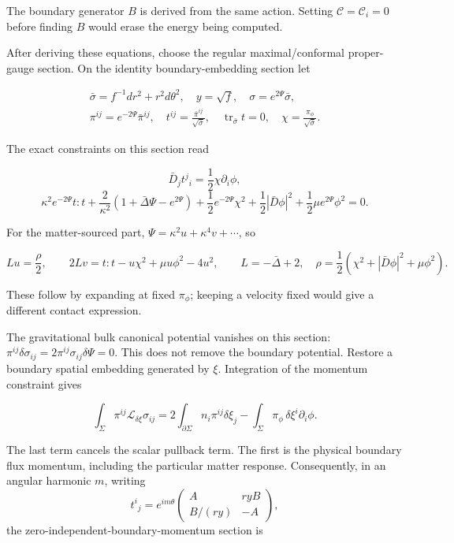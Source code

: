\documentclass[a4paper,11pt]{article}
\numberwithin{equation}{section}
\begin{document}
The boundary generator \(B\) is derived from the same action. Setting \(\mathcal C=\mathcal C_i=0\) before finding \(B\) would erase the energy being computed.

After deriving these equations, choose the regular maximal/conformal proper-gauge section. On the identity boundary-embedding section let

\[
\begin{gathered}
\bar\sigma=f^{-1}dr^2+r^2d\theta^2,\quad y=\sqrt f,\quad
\sigma=e^{2\Psi}\bar\sigma,\\
\pi^{ij}=e^{-2\Psi}\bar\pi^{ij},\quad
t^{ij}=\frac{\bar\pi^{ij}}{\sqrt{\bar\sigma}},\quad
\operatorname{tr}_{\bar\sigma}t=0,\quad
\chi=\frac{\pi_\phi}{\sqrt{\bar\sigma}}.
\end{gathered}
\tag{2.13}
\]

The exact constraints on this section read

\[
\bar D_jt^j{}_i=\frac12\chi\partial_i\phi,
\tag{2.14}
\] \[
\kappa^2e^{-2\Psi}t:t
+\frac2{\kappa^2}(1+\bar\Delta\Psi-e^{2\Psi})
+\frac12e^{-2\Psi}\chi^2
+\frac12|\bar D\phi|^2
+\frac12\mu e^{2\Psi}\phi^2=0 .
\tag{2.15}
\]

For the matter-sourced part, \(\Psi=\kappa^2u+\kappa^4v+\cdots\), so

\[
Lu=\frac{\rho}{2},\qquad
2Lv=t:t-u\chi^2+\mu u\phi^2-4u^2,\qquad
L=-\bar\Delta+2,\quad
\rho=\frac12(\chi^2+|\bar D\phi|^2+\mu\phi^2).
\tag{2.16}
\]

These follow by expanding at fixed \(\pi_\phi\); keeping a velocity fixed would give a different contact expression.

The gravitational bulk canonical potential vanishes on this section: \(\pi^{ij}\delta\sigma_{ij}=2\pi^{ij}\sigma_{ij}\delta\Psi=0\). This does not remove the boundary potential. Restore a boundary spatial embedding generated by \(\xi\). Integration of the momentum constraint gives

\[
\int_\Sigma\pi^{ij}\mathcal L_{\delta\xi}\sigma_{ij}
=2\int_{\partial\Sigma}n_i\pi^{ij}\delta\xi_j
-\int_\Sigma\pi_\phi\,\delta\xi^i\partial_i\phi .
\tag{2.17}
\]

The last term cancels the scalar pullback term. The first is the physical boundary flux momentum, including the particular matter response. Consequently, in an angular harmonic \(m\), writing \[
t^i{}_j=e^{im\theta}
\begin{pmatrix}A&ryB\\ B/(ry)&-A\end{pmatrix},
\] the zero-independent-boundary-momentum section is
\end{document}

